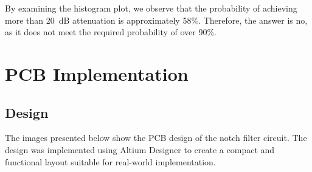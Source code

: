 \documentclass[hidelinks,12pt]{article}
\begin{document}
	By examining the histogram plot, we observe that the probability of achieving more than 20~dB attenuation is approximately 58\%. Therefore, the answer is no, as it does not meet the required probability of over 90\%.
	
	\pagebreak
	
	\newpage
	
	\section{PCB Implementation}
	\subsection{Design}
	The images presented below show the PCB design of the notch filter circuit. The design was implemented using Altium Designer to create a compact and functional layout suitable for real-world implementation.
	
	\vspace{1cm}
	
\end{document}
